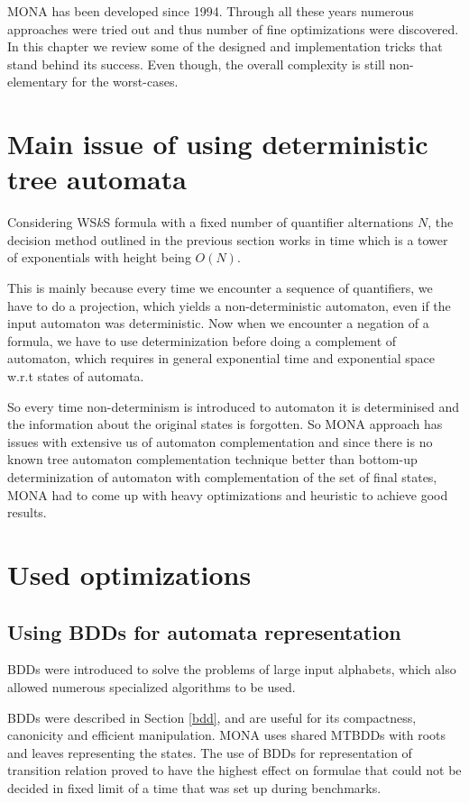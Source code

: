 \textsc{MONA} has been developed since 1994. Through all these years numerous
approaches were tried out and thus number of fine optimizations were discovered.
In this chapter we review some of the designed and implementation tricks that
stand behind its success. Even though, the overall complexity is still
non-elementary for the worst-cases.

\section{Main issue of using deterministic tree automata}

Considering WS$k$S formula with a fixed number of quantifier alternations $N$,
the decision method outlined in the previous section works in time which is a
tower of exponentials with height being $O(N)$.

This is mainly because every time we encounter a sequence of quantifiers, we
have to do a projection, which yields a non-deterministic automaton, even if the
input automaton was deterministic. Now when we encounter a negation of a
formula, we have to use determinization before doing a complement of automaton,
which requires in general exponential time and exponential space w.r.t states of
automata.

So every time non-determinism is introduced to automaton it is determinised and
the information about the original states is forgotten. So \textsc{MONA}
approach has issues with extensive us of automaton complementation and since there
is no known tree automaton complementation technique better than bottom-up
determinization of automaton with complementation of the set of final states,
\textsc{MONA} had to come up with heavy optimizations and heuristic to achieve
good results.

 \section{Used optimizations}\label{monasecrets}
\subsection{Using BDDs for automata representation}\label{monabdd}
BDDs were introduced to solve the problems of large input alphabets, which also
allowed numerous specialized algorithms to be used.

BDDs were described in Section \ref{bdd}, and are useful for its compactness,
canonicity and efficient manipulation. \textsc{MONA} uses shared MTBDDs with
roots and leaves representing the states. The use of BDDs for representation  of
transition relation proved to have the highest effect on formulae that could not
be decided in fixed limit of a time that was set up during benchmarks.

